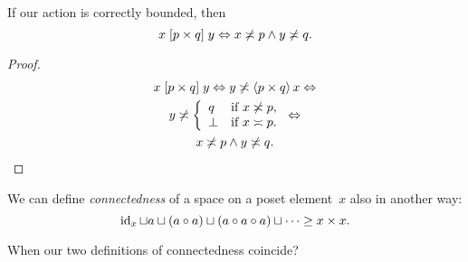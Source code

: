 % 
% 

\begin{thm}
If our action is correctly bounded, then
\[ x\mathrel{\left[p\times q\right]}y\Leftrightarrow x\not\asymp p\land y\not\asymp q. \]
\end{thm}

\begin{proof}
\begin{multline*}
x\mathrel{\left[p\times q\right]}y \Leftrightarrow
y\not\asymp\left\langle p\times q\right\rangle x \Leftrightarrow \\
y\not\asymp
\left\{\begin{array}{ll}q&\text{if }x\not\asymp p,\\\bot&\text{if }x\asymp p.\end{array}\right. \Leftrightarrow \\
x\not\asymp p\land y\not\asymp q.
\end{multline*}
\end{proof}

% 

\begin{defn}
We can define \emph{connectedness} of a space on a poset element~$x$ also in another way:
\[ \operatorname{id}_x\sqcup a\sqcup(a\circ a)\sqcup(a\circ a\circ a)\sqcup\dots \geq x\times x. \]
\end{defn}

\begin{problem}
When our two definitions of connectedness coincide?
\end{problem}

